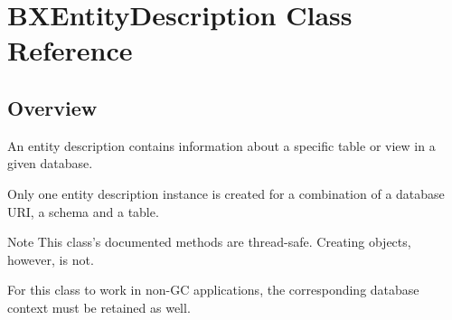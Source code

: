 \hypertarget{interface_b_x_entity_description}{}\section{B\+X\+Entity\+Description Class Reference}
\label{interface_b_x_entity_description}


\subsection{Overview}
An entity description contains information about a specific table or view in a given database. 

Only one entity description instance is created for a combination of a database U\+R\+I, a schema and a table.

\begin{DoxyNote}{Note}
This class's documented methods are thread-\/safe. Creating objects, however, is not. 

For this class to work in non-\/\+G\+C applications, the corresponding database context must be retained as well. 
\end{DoxyNote}
